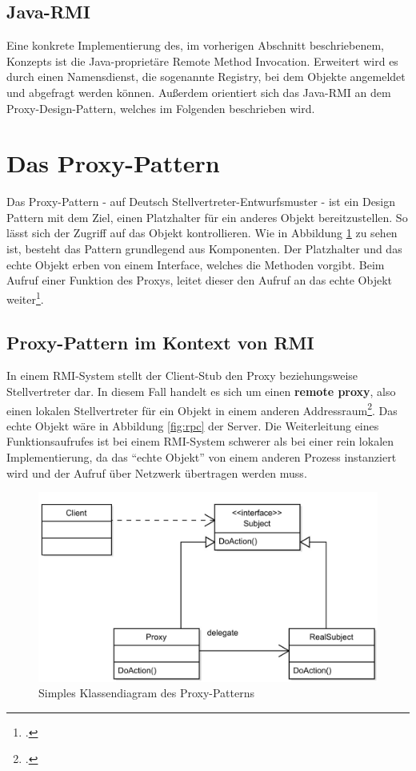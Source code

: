 \documentclass[a4paper,oneside,10pt]{report}
\begin{document}
\subsection{Java-RMI}

Eine konkrete Implementierung des, im vorherigen Abschnitt beschriebenem, Konzepts ist die Java-proprietäre Remote Method Invocation. Erweitert wird es durch einen Namensdienst, die sogenannte Registry, bei dem Objekte angemeldet und abgefragt werden können. Außerdem orientiert sich das Java-RMI an dem Proxy-Design-Pattern, welches im Folgenden beschrieben wird. 

\section{Das Proxy-Pattern}

Das Proxy-Pattern - auf Deutsch Stellvertreter-Entwurfsmuster - ist ein Design Pattern mit dem Ziel, einen Platzhalter für ein anderes Objekt bereitzustellen. So lässt sich der Zugriff auf das Objekt kontrollieren. Wie in Abbildung \ref{fig:proxy} zu sehen ist, besteht das Pattern grundlegend aus Komponenten. Der Platzhalter und das echte Objekt erben von einem Interface, welches die Methoden vorgibt. Beim Aufruf einer Funktion des Proxys, leitet dieser den Aufruf an das echte Objekt weiter\footcite[vgl.][Seite 207]{DesignPatterns}. 

\subsection{Proxy-Pattern im Kontext von RMI}

In einem RMI-System stellt der Client-Stub den Proxy beziehungsweise Stellvertreter dar. In diesem Fall handelt es sich um einen \textbf{remote proxy}, also einen lokalen Stellvertreter für ein Objekt in einem anderen Addressraum\footcite[vgl.][Seite 208]{DesignPatterns}. Das echte Objekt wäre in Abbildung \ref{fig:rpc} der Server. Die Weiterleitung eines Funktionsaufrufes ist bei einem RMI-System schwerer als bei einer rein lokalen Implementierung, da das "`echte Objekt"' von einem anderen Prozess instanziert wird und der Aufruf über Netzwerk übertragen werden muss. 

\begin{figure}
	\centering
	\includegraphics[width=12cm]{proxy_diagram}
	\caption[]{Simples Klassendiagram des Proxy-Patterns\footnotemark}
	\label{fig:proxy}
\end{figure}
\end{document}
